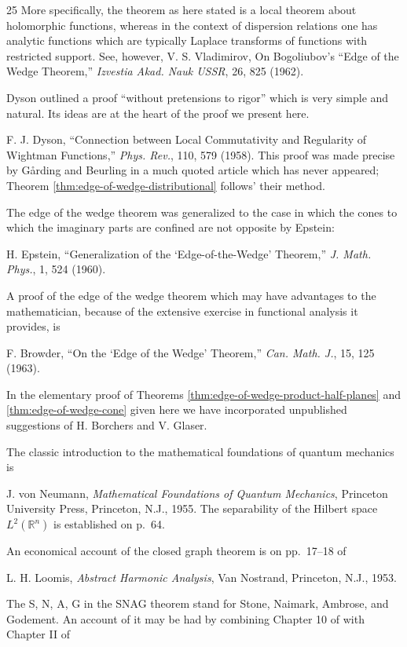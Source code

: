 \begin{thebibliography}{25}
More specifically, the theorem as here stated is a local theorem about
holomorphic functions, whereas in the context of dispersion relations one has
analytic functions which are typically Laplace transforms of functions with
restricted support.  See, however, V. S. Vladimirov, On Bogoliubov's ``Edge of
the Wedge Theorem,'' \emph{Izvestia Akad. Nauk USSR}, 26, 825 (1962).

Dyson outlined a proof ``without pretensions to rigor'' which is very simple
and natural.  Its ideas are at the heart of the proof we present here.

F. J. Dyson, ``Connection between Local Commutativity and Regularity of
Wightman Functions,'' \emph{Phys. Rev.}, 110, 579 (1958).  This proof was
made precise by G\aa rding and Beurling in a much quoted article which has
never appeared; Theorem \ref{thm:edge-of-wedge-distributional} follows' their method.

The edge of the wedge theorem was generalized to the case in which the cones
to which the imaginary parts are confined are not opposite by Epstein:

H. Epstein, ``Generalization of the `Edge-of-the-Wedge' Theorem,''
\emph{J. Math. Phys.}, 1, 524 (1960).

A proof of the edge of the wedge theorem which may have advantages to the
mathematician, because of the extensive exercise in functional analysis it
provides, is

F. Browder, ``On the `Edge of the Wedge' Theorem,'' \emph{Can. Math. J.}, 15,
125 (1963).

In the elementary proof of Theorems \ref{thm:edge-of-wedge-product-half-planes} and \ref{thm:edge-of-wedge-cone} given here we have
incorporated unpublished suggestions of H. Borchers and V. Glaser.

The classic introduction to the mathematical foundations of quantum mechanics
is

J. von Neumann, \emph{Mathematical Foundations of Quantum Mechanics},
Princeton University Press, Princeton, N.J., 1955.  The separability of the
Hilbert space $L^2(\mathbb{R}^n)$ is established on p.~64.

An economical account of the closed graph theorem is on pp.~17--18 of

L. H. Loomis, \emph{Abstract Harmonic Analysis}, Van Nostrand, Princeton,
N.J., 1953.

The S, N, A, G in the SNAG theorem stand for Stone, Naimark, Ambrose, and
Godement. An account of it may be had by combining Chapter 10 of \cite{pct-25}
with Chapter II of


\end{thebibliography}

